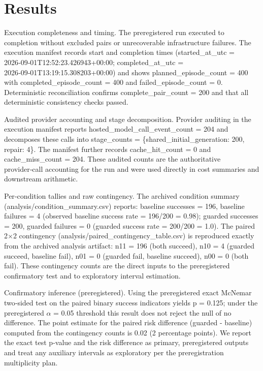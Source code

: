 \documentclass[conference]{IEEEtran}
\begin{document}
\section{Results}
Execution completeness and timing. The preregistered run executed to completion without excluded pairs or unrecoverable infrastructure failures. The execution manifest records start and completion times (started\_at\_utc = 2026‑09‑01T12:52:23.426943+00:00; completed\_at\_utc = 2026‑09‑01T13:19:15.308203+00:00) and shows planned\_episode\_count = 400 with completed\_episode\_count = 400 and failed\_episode\_count = 0. Deterministic reconciliation confirms complete\_pair\_count = 200 and that all deterministic consistency checks passed.

Audited provider accounting and stage decomposition. Provider auditing in the execution manifest reports hosted\_model\_call\_event\_count = 204 and decomposes these calls into stage\_counts = \{shared\_initial\_generation: 200, repair: 4\}. The manifest further records cache\_hit\_count = 0 and cache\_miss\_count = 204. These audited counts are the authoritative provider‑call accounting for the run and were used directly in cost summaries and downstream arithmetic.

Per‑condition tallies and raw contingency. The archived condition summary (analysis/condition\_summary.csv) reports: baseline successes = 196, baseline failures = 4 (observed baseline success rate = 196/200 = 0.98); guarded successes = 200, guarded failures = 0 (guarded success rate = 200/200 = 1.0). The paired 2\ensuremath{\times}2 contingency (analysis/paired\_contingency\_table.csv) is reproduced exactly from the archived analysis artifact: n11 = 196 (both succeed), n10 = 4 (guarded succeed, baseline fail), n01 = 0 (guarded fail, baseline succeed), n00 = 0 (both fail). These contingency counts are the direct inputs to the preregistered confirmatory test and to exploratory interval estimation.

Confirmatory inference (preregistered). Using the preregistered exact McNemar two‑sided test on the paired binary success indicators yields p = 0.125; under the preregistered \ensuremath{\alpha} = 0.05 threshold this result does not reject the null of no difference. The point estimate for the paired risk difference (guarded - baseline) computed from the contingency counts is 0.02 (2 percentage points). We report the exact test p‑value and the risk difference as primary, preregistered outputs and treat any auxiliary intervals as exploratory per the preregistration multiplicity plan.
\end{document}
